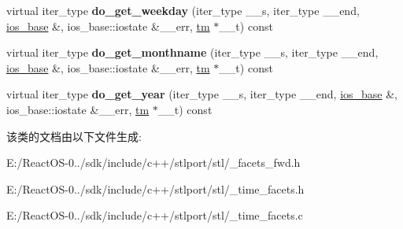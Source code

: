 \begin{DoxyCompactItemize}
virtual iter\+\_\+type {\bfseries do\+\_\+get\+\_\+weekday} (iter\+\_\+type \+\_\+\+\_\+s, iter\+\_\+type \+\_\+\+\_\+end, \hyperlink{classios__base}{ios\+\_\+base} \&, ios\+\_\+base\+::iostate \&\+\_\+\+\_\+err, \hyperlink{structtm}{tm} $\ast$\+\_\+\+\_\+t) const
\item 
\mbox{\label{classtime__get_a5cd91e2ef6a6bce2ec34592ae15751f9}} 
virtual iter\+\_\+type {\bfseries do\+\_\+get\+\_\+monthname} (iter\+\_\+type \+\_\+\+\_\+s, iter\+\_\+type \+\_\+\+\_\+end, \hyperlink{classios__base}{ios\+\_\+base} \&, ios\+\_\+base\+::iostate \&\+\_\+\+\_\+err, \hyperlink{structtm}{tm} $\ast$\+\_\+\+\_\+t) const
\item 
\mbox{\label{classtime__get_a532cdca65cea4667d933d8d17292decb}} 
virtual iter\+\_\+type {\bfseries do\+\_\+get\+\_\+year} (iter\+\_\+type \+\_\+\+\_\+s, iter\+\_\+type \+\_\+\+\_\+end, \hyperlink{classios__base}{ios\+\_\+base} \&, ios\+\_\+base\+::iostate \&\+\_\+\+\_\+err, \hyperlink{structtm}{tm} $\ast$\+\_\+\+\_\+t) const
\end{DoxyCompactItemize}


该类的文档由以下文件生成\+:\begin{DoxyCompactItemize}
\item 
E\+:/\+React\+O\+S-\/0../sdk/include/c++/stlport/stl/\+\_\+facets\+\_\+fwd.\+h\item 
E\+:/\+React\+O\+S-\/0../sdk/include/c++/stlport/stl/\+\_\+time\+\_\+facets.\+h\item 
E\+:/\+React\+O\+S-\/0../sdk/include/c++/stlport/stl/\+\_\+time\+\_\+facets.\+c\end{DoxyCompactItemize}

